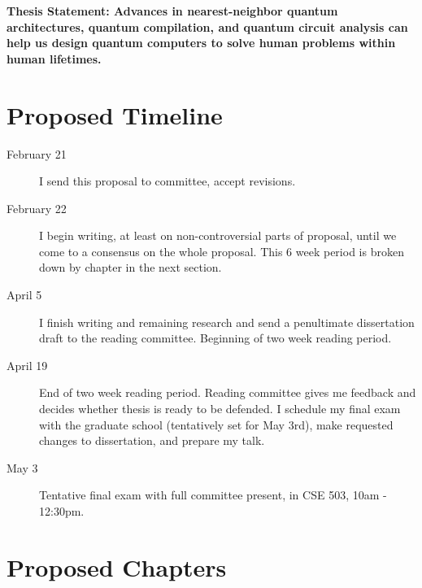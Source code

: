 \documentclass[]{article}
\theoremstyle{plain} \newtheorem{lemma}{Lemma}
\begin{document}
\textbf{Thesis Statement: Advances in nearest-neighbor quantum architectures,
quantum compilation, and quantum circuit analysis can help us design
quantum computers to solve human problems within human lifetimes.}

\pagebreak
\section{Proposed Timeline}

\begin{description}
\item[February 21]
I send this proposal to committee, accept revisions.

\item[February 22]
I begin writing, at least on non-controversial parts of proposal, until
we come to a consensus on the whole proposal. This 6 week period is
broken down by chapter in the next section.

\item[April 5]
I finish writing and remaining research and send a penultimate dissertation
draft to the reading committee. Beginning of two week reading period.

\item[April 19]
End of two week reading period. Reading committee gives me feedback and
decides whether thesis is ready to be defended. I schedule my final exam with
the graduate school (tentatively set for May 3rd), make requested changes to dissertation,
and prepare my talk.

\item[May 3]
Tentative final exam with full committee present, in CSE 503, 10am - 12:30pm.

\end{description}

\section{Proposed Chapters}
\end{document}
